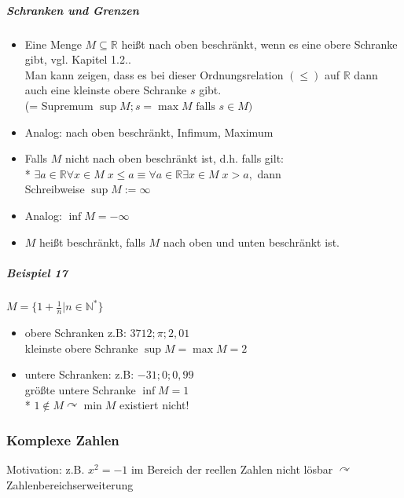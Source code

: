 \documentclass[a4paper]{scrartcl}
\begin{document}
\subparagraph{Schranken und Grenzen}
\begin{itemize}
\item Eine Menge $M \subseteq \mathbb{R}$ heißt nach oben beschränkt, wenn es eine obere Schranke gibt, vgl. Kapitel 1.2..\\ Man kann zeigen, dass es bei dieser Ordnungsrelation $(\leq )$ auf $\mathbb{R}$ dann auch eine kleinste obere Schranke $s$ gibt.\\
(= Supremum $\sup{M}; s=\max{M} \text{ falls } s \in M)$
\item Analog: nach oben beschränkt, Infimum, Maximum
\item Falls $M$ nicht nach oben beschränkt ist, d.h. falls gilt:\\*
$\exists a \in \mathbb{R} \forall x \in M \; x \leq a \equiv \forall a \in \mathbb{R} \exists x \in M \; x > a,$ dann\\
Schreibweise $\sup{M} := \infty$
\item Analog: $\inf{M} = - \infty$
\item $M$ heißt beschränkt, falls $M$ nach oben und unten beschränkt ist.
\end{itemize}

\subparagraph{Beispiel 17} $M= \{ 1 + \frac{1}{n} | n \in \mathbb{N}^*\}$
\begin{itemize}
\item obere Schranken z.B: $3712; \pi ; 2,01$\\
kleinste obere Schranke $\sup{M}=\max{M}=2$
\item untere Schranken: z.B: $-31; 0;0,99$\\
größte untere Schranke $\inf{M}=1$\\*
$1 \notin M \curvearrowright \min{M}$ existiert nicht!
\end{itemize}

\subsubsection{Komplexe Zahlen}
Motivation: z.B. $x^2 = -1$ im Bereich der reellen Zahlen nicht lösbar $\curvearrowright$ Zahlenbereichserweiterung
\end{document}
